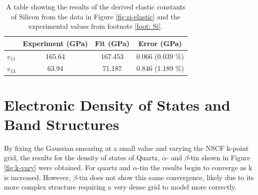 \documentclass[12pt]{article}
\begin{document}
\begin{table}[h!!!!!]
	\centering
	\begin{tabular}{l|c|c|c|}
		\cline{2-4}
		\multicolumn{1}{c|}{}           & Experiment (GPa) & Fit (GPa)         & Error (GPa)              \\ \hline
		\multicolumn{1}{|l|}{c$_{11}$} & 165.64 & 167.453             & 0.066 (0.039 \%)         \\ \hline
		\multicolumn{1}{|l|}{c$_{13}$} & 63.94 & 71.187              & 0.846 (1.189 \%)         \\ \hline
	\end{tabular}
\caption{A table showing the results of the derived elastic constants of Silicon from the data in Figure \ref{fig:si-elastic} and the experimental values from footnote \ref{foot: Si}.}
\label{tab:si-elastic}
\end{table}


\clearpage
\section*{Electronic Density of States and Band Structures}

By fixing the Gaussian smearing at a small value and varying the NSCF k-point grid, the results for the density of states of Quartz, $\alpha$- and $\beta$-tin shown in Figure \ref{fig:k-vary} were obtained. For quartz and $\alpha$-tin the results begin to converge as k is increased. However, $\beta$-tin does not show this same convergence, likely due to its more complex structure requiring a very dense grid to model more correctly.
\end{document}
